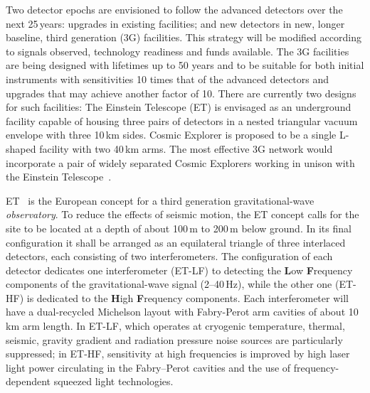 Two detector epochs are envisioned 
to follow the advanced detectors over the next 25\,years: upgrades in existing facilities; %
and new detectors in new, longer baseline, third generation (3G) facilities. This strategy will be modified according to signals observed, technology readiness and funds available.
The 3G facilities are being designed with lifetimes up to 50 years and to be suitable for both initial instruments with sensitivities 10 times that of the advanced detectors and upgrades that may achieve another factor of 10. There are currently two designs for such facilities:  The Einstein Telescope (ET) is envisaged as an underground facility capable of housing three pairs of detectors in a nested triangular vacuum envelope with three 10\,km sides. Cosmic Explorer is proposed to be a single L-shaped facility with two 40\,km arms. The most effective 3G network would incorporate a pair of widely separated Cosmic Explorers working in unison with the Einstein Telescope~\cite{Hall:2019xmm}.

\begin{tcolorbox}[standard jigsaw,colback=amber!10!white,colframe=red!70!black,coltext=black, title=The Einstein gravitational--wave Telescope (ET)] ET~\cite{ET2011} is the European concept for a third generation gravitational-wave \emph{observatory}. To reduce the effects of seismic motion, the ET concept calls for the site to be located at a depth of about 100\,m to 200\,m below ground. In its final configuration it shall be arranged as an equilateral triangle of three interlaced detectors, each consisting of two interferometers. The configuration of each detector dedicates one interferometer (ET-LF) to detecting the \textbf{L}ow \textbf{F}requency components of the gravitational-wave signal (2--40\,Hz), while the other one (ET-HF) is dedicated to the \textbf{H}igh \textbf{F}requency components. Each interferometer will have a dual-recycled Michelson layout with Fabry-Perot arm cavities of about 10\,km arm length. In ET-LF, which operates at cryogenic temperature, thermal, seismic, gravity gradient and radiation pressure noise sources are particularly suppressed; in ET-HF, sensitivity at high frequencies is improved by high laser light power circulating in the Fabry--Perot cavities and the use of frequency-dependent squeezed light technologies.
\end{tcolorbox}

